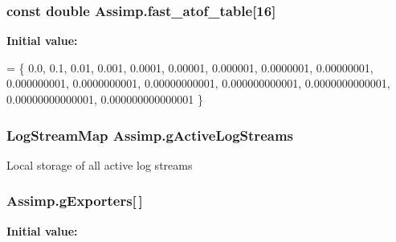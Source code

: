 \hypertarget{class_assimp_a0e8254cfacbe21bb6979ca2009edb19b}{
\subsubsection[{fast\+\_\+atof\+\_\+table}]{\setlength{\rightskip}{0pt plus 5cm}const double Assimp.\+fast\+\_\+atof\+\_\+table\mbox{[}16\mbox{]}}}\label{class_assimp_a0e8254cfacbe21bb6979ca2009edb19b}
{\bfseries Initial value\+:}
\begin{DoxyCode}
=   \{  
    0.0,
    0.1,
    0.01,
    0.001,
    0.0001,
    0.00001,
    0.000001,
    0.0000001,
    0.00000001,
    0.000000001,
    0.0000000001,
    0.00000000001,
    0.000000000001,
    0.0000000000001,
    0.00000000000001,
    0.000000000000001
\}
\end{DoxyCode}
\hypertarget{class_assimp_a9ef8ca5f186af017ce60e63e4865ad61}{
\subsubsection[{g\+Active\+Log\+Streams}]{\setlength{\rightskip}{0pt plus 5cm}Log\+Stream\+Map Assimp.\+g\+Active\+Log\+Streams\hspace{0.3cm}{\ttfamily [static]}}}\label{class_assimp_a9ef8ca5f186af017ce60e63e4865ad61}
Local storage of all active log streams \hypertarget{class_assimp_ab0388f3202d8aa9dcd844c53c8efe68c}{
\subsubsection[{g\+Exporters}]{ Assimp.\+g\+Exporters\mbox{[}$\,$\mbox{]}}}\label{class_assimp_ab0388f3202d8aa9dcd844c53c8efe68c}
{\bfseries Initial value\+:}
